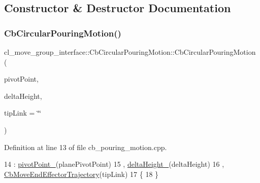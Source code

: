 \subsection{Constructor \& Destructor Documentation}
\mbox{\label{classcl__move__group__interface_1_1CbCircularPouringMotion_a774a9d74ca112002c89a375f06166257}} 
\subsubsection{\texorpdfstring{Cb\+Circular\+Pouring\+Motion()}{CbCircularPouringMotion()}}
{\footnotesize\ttfamily cl\+\_\+move\+\_\+group\+\_\+interface\+::\+Cb\+Circular\+Pouring\+Motion\+::\+Cb\+Circular\+Pouring\+Motion (\begin{DoxyParamCaption}\item[{const geometry\+\_\+msgs\+::\+Point\+Stamped \&}]{pivot\+Point,  }\item[{double}]{delta\+Height,  }\item[{std\+::string}]{tip\+Link = {\ttfamily \char`\"{}\char`\"{}} }\end{DoxyParamCaption})}



Definition at line 13 of file cb\+\_\+pouring\+\_\+motion.\+cpp.


\begin{DoxyCode}
14         : \hyperlink{classcl__move__group__interface_1_1CbCircularPouringMotion_a4c100d8ba3e57f7ddfb614017d115fca}{pivotPoint\_}(planePivotPoint)
15         , \hyperlink{classcl__move__group__interface_1_1CbCircularPouringMotion_a7009d617bcd8ac1fba49100444434f3c}{deltaHeight\_}(deltaHeight)
16         , \hyperlink{classcl__move__group__interface_1_1CbMoveEndEffectorTrajectory_af7e718b0c53e912fd74968abbb0a4810}{CbMoveEndEffectorTrajectory}(tipLink)
17     \{
18     \}
\end{DoxyCode}


